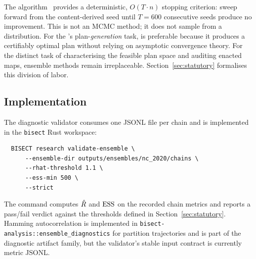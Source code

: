 The \cs{} algorithm~\citep{b16paper} provides a deterministic, $O(T \cdot n)$
stopping criterion: sweep forward from the content-derived seed until
$T = 600$ consecutive seeds produce no improvement.
This is not an MCMC method; it does not sample from a distribution.
For the \dia{}'s plan-\emph{generation} task, \cs{} is preferable because
it produces a certifiably optimal plan without relying on asymptotic
convergence theory.
For the distinct task of characterising the feasible plan space and
auditing enacted maps, ensemble methods remain irreplaceable.
Section~\ref{sec:statutory} formalises this division of labor.

\subsection{Implementation}

The diagnostic validator consumes one JSONL file per chain and is implemented
in the \texttt{bisect} Rust workspace:
\begin{verbatim}
  BISECT research validate-ensemble \
      --ensemble-dir outputs/ensembles/nc_2020/chains \
      --rhat-threshold 1.1 \
      --ess-min 500 \
      --strict
\end{verbatim}
The command computes $\hat{R}$ and $\mathrm{ESS}$ on the recorded chain metrics and
reports a pass/fail verdict against the thresholds defined in
Section~\ref{sec:statutory}. Hamming autocorrelation is implemented in
\texttt{bisect-analysis::ensemble\_diagnostics} for partition trajectories and
is part of the diagnostic artifact family, but the validator's stable input
contract is currently metric JSONL.
